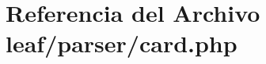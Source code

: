 \hypertarget{leaf_2parser_2card_8php}{\section{Referencia del Archivo leaf/parser/card.php}
\label{leaf_2parser_2card_8php}
}
